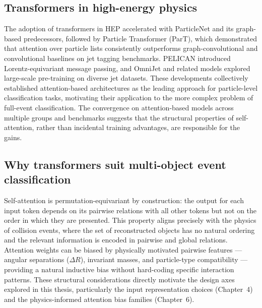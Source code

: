 
\subsection{Transformers in high-energy physics}
\label{subsec:intro_transformers_in_hep}

The adoption of transformers in HEP accelerated with ParticleNet and its graph-based predecessors, followed by Particle Transformer (ParT), which demonstrated that attention over particle lists consistently outperforms graph-convolutional and convolutional baselines on jet tagging benchmarks.
PELICAN introduced Lorentz-equivariant message passing, and OmniJet and related models explored large-scale pre-training on diverse jet datasets.
These developments collectively established attention-based architectures as the leading approach for particle-level classification tasks, motivating their application to the more complex problem of full-event classification.
The convergence on attention-based models across multiple groups and benchmarks suggests that the structural properties of self-attention, rather than incidental training advantages, are responsible for the gains.

\subsection{Why transformers suit multi-object event classification}
\label{subsec:intro_why_transformers}

Self-attention is permutation-equivariant by construction: the output for each input token depends on its pairwise relations with all other tokens but not on the order in which they are presented.
This property aligns precisely with the physics of collision events, where the set of reconstructed objects has no natural ordering and the relevant information is encoded in pairwise and global relations.
Attention weights can be biased by physically motivated pairwise features --- angular separations ($\Delta R$), invariant masses, and particle-type compatibility --- providing a natural inductive bias without hard-coding specific interaction patterns.
These structural considerations directly motivate the design axes explored in this thesis, particularly the input representation choices (Chapter~4) and the physics-informed attention bias families (Chapter~6).


